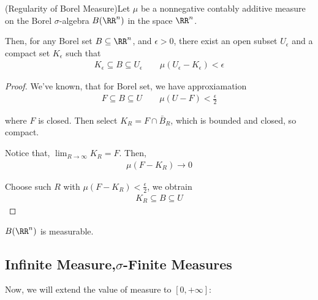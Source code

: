 \documentclass[Total.tex]{subfiles}
\begin{document}
				\begin{proposition}
					(Regularity of Borel Measure)Let $\mu$ be a nonnegative contably additive measure on the Borel $\sigma$-algebra $B(\RR^n)$ in the space $\RR^n$. 
					
					Then, for any Borel set $B\subseteq \RR^n$, and $\epsilon>0$, there exist an open subset $U_\epsilon$ and a compact set $K_\epsilon$ such that
					\begin{gather*}
						K_\epsilon\subseteq B\subseteq U_\epsilon\qquad \mu(U_\epsilon-K_\epsilon)<\epsilon
					\end{gather*}
				\end{proposition}
				\begin{proof}
					We've known, that for Borel set, we have approxiamation
					\begin{gather*}
					F\subseteq B\subseteq U\qquad \mu(U-F)<\frac{\epsilon}{2}
					\end{gather*}
					
					where $F$ is closed. Then select $K_R=F\cap \bar{B}_R$, which is bounded and closed, so compact. 
					
					Notice that, $\lim_{R\rightarrow \infty} K_R=F$. Then, 
					\begin{gather*}
						\mu(F-K_R)\rightarrow 0
					\end{gather*}
					
					Choose such $R$ with $\mu(F-K_R)<\frac{\epsilon}{2}$, we obtrain 
					\begin{gather*}
						K_R\subseteq B\subseteq U
					\end{gather*}
				\end{proof}
				
				\begin{corollary}
					$B(\RR^n)$ is measurable. 
				\end{corollary}
			\subsection{Infinite Measure,$\sigma$-Finite Measures}	
				Now, we will extend the value of measure to $[0,+\infty]$:
				
\end{document}

